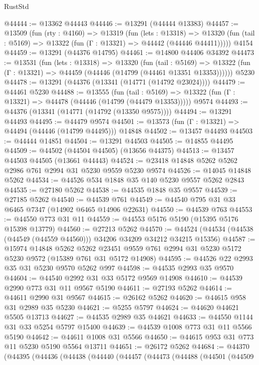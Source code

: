 \begin{lexlean}{RustStd}
\begin{coremodule}
@44444 := @13362 @44443
@44446 := @13291 (@44444 @13383)
@44457 := @13509
    (fun (rty : @4160) =>
    @13319
      (fun (lets : @13318) =>
      @13320 (fun (tail : @5169) => @13322 (fun (Γ : @13321) => @44442 (@44446 @44411)))))
    @4154
@44459 := @13291 (@44376 @14795)
@44461 := @14800 @44406 @34392
@44473 := @13531
    (fun (lets : @13318) =>
    @13320
      (fun (tail : @5169) =>
      @13322 (fun (Γ : @13321) => @44459 (@44446 (@14799 (@44461 @13351 @13353))))))
    @5230
@44478 := @13291 (@44376 (@13341 (@14771 (@14792 @23024))))
@44479 := @44461 @5230
@44488 := @13555
    (fun (tail : @5169) => @13322 (fun (Γ : @13321) => @44478 (@44446 (@14799 (@44479 @13353)))))
    @9574
@44493 := @44376 (@13341 (@14771 (@14792 (@13350 @9575))))
@44494 := @13291 @44493
@44495 := @44479 @9574
@44501 := @13573 (fun (Γ : @13321) => @44494 (@44446 (@14799 @44495))) @14848
@44502 := @13457 @44493
@44503 := @44444 @14851
@44504 := @13291 @44503
@44505 := @14855 @44495
@44509 := @44502 (@44504 @44505) (@13656 @44375)
@44513 := @13457 @44503 @44505 (@13661 @44443)
@44524 := @23418 @14848 @5262 @5262 @2986 @761 @2994 @31 @5230 @9559 @5230 @9574
@44526 := @14045 @14848 @5262
@44534 := @44526 @534 @1848 @35 @140 @5230 @9557 @5262 @2843
@44535 := @27180 @5262
@44538 := @44535 @1848 @35 @9557
@44539 := @27185 @5262
@44540 := @44539 @761
@44549 := @44540 @795 @31 @33 @6465 @7347 (@14902 @6465 @14906 @22631)
@44550 := @44539 @763
@44553 := @44550 @773 @31 @11
@44559 := @44553 @5176 @5190 (@15395 @5176 @15398 @13779)
@44560 := @27213 @5262
@44570 := @44524 (@44534 (@44538 (@44549 (@44559 @44560))) @34206 @34209 @34212 @34215 @15356)
@44587 := @15974
    @14848
    @5262
    @5262
    @23451
    @9559
    @761
    @2994
    @31
    @5230
    @5172
    @5230
    @9572
    (@15389 @761 @31 @5172 @14908)
@44595 := @44526 @22 @2993 @35 @31 @5230 @9570 @5262 @997
@44598 := @44535 @2993 @35 @9570
@44604 := @44540 @2992 @31 @33 @5172 @9569 @14908
@44610 := @44539 @2990 @773 @31 @11 @9567 @5190
@44611 := @27193 @5262
@44614 := @44611 @2990 @31 @9567
@44615 := @26162 @5262
@44620 := @44615 @958 @31 @2989 @35 @5230
@44621 := @5255 @5797
@44624 := @44620 @44621 @5505 @13713
@44627 := @44535 @2989 @35 @44621
@44633 := @44550 @1144 @31 @33 @5254 @5797 @15400
@44639 := @44539 @1008 @773 @31 @11 @5566 @5190
@44642 := @44611 @1008 @31 @5566
@44650 := @44615 @953 @31 @773 @11 @5230 @5190 @5564 @13711
@44651 := @26172 @5262
@44684 := @44370
    (@44395
      (@44436
        (@44438
          (@44440
            (@44457
              (@44473
                (@44488
                  (@44501
                    (@44509

\end{coremodule}
\end{lexlean}
